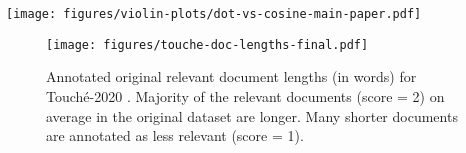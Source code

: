 \documentclass{article}
\begin{document}
\begin{table}[htb!]
    \small
    \texttt{[image: figures/violin-plots/dot-vs-cosine-main-paper.pdf]}
    \caption{Violin plots \cite{citeulike:4075875} of document lengths for the top-10 retrieved hits and nDCG@10 scores using a distilbert-base-uncased model trained with either cosine similarity (blue, top) or dot product (orange, bottom) as described in Appendix \ref{sec:dense_retrieval_length_preference}.}
    \label{tab:trec-covid}
    \vspace*{-\baselineskip}
\end{table}

\begin{figure}[htb!]
\centering
\begin{center}
    \texttt{[image: figures/touche-doc-lengths-final.pdf]}
    \caption{Annotated original relevant document lengths (in words) for Touch\'e-2020 \cite{stein:2020v}. Majority of the relevant documents (score = 2) on average in the original dataset are longer. Many shorter documents are annotated as less relevant (score = 1).}
    \label{fig:touche-task}
    \vspace*{-\baselineskip}
\end{center}
\end{figure}
\end{document}
